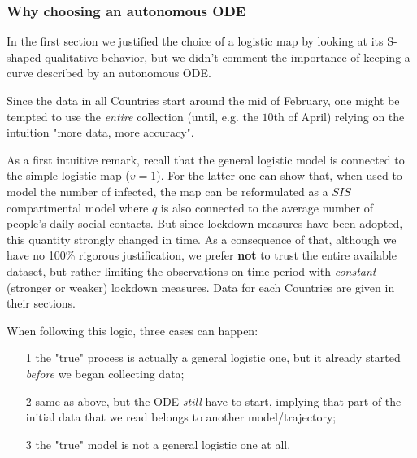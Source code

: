\documentclass[8pt]{article}
\begin{document}
\subsubsection{Why choosing an autonomous ODE}
In the first section we justified the choice of a logistic map by looking
at its S-shaped qualitative behavior, but we didn't comment the
importance of keeping
a curve described by an autonomous ODE.


Since the data in all Countries start around the mid
of February, one might be tempted to use the \emph{entire}
collection (until, e.g. the $10$th of April)
relying on the intuition "more data, more accuracy".


As a first intuitive remark,
recall that the general logistic model is connected to the simple
logistic map ($v = 1$). For the latter one can show that,
when used to model the number of infected,
the map can be reformulated as a $SIS$ compartmental model
where $q$ is also connected to the average number of people's
daily social contacts.
But since lockdown measures have been adopted, this quantity
strongly changed in time. As a consequence of that, although
we have no 100\% rigorous justification,
we prefer \textbf{not} to trust the entire available dataset, but rather
limiting the observations on time period with
\emph{constant} (stronger or weaker) lockdown measures.
Data for each Countries
are given in their sections.


When following this logic, three cases can happen:
\begin{itemize}
	\item[1] the "true" process is actually a general logistic one,
		but it already started \emph{before} we began collecting data;
	\item[2] same as above, but the ODE \emph{still} have
		to start, implying that part of the
		initial data that we read belongs to
		another model/trajectory;
	\item[3] the "true" model is not a general logistic one at all.
\end{itemize}
\end{document}
